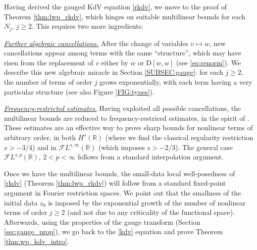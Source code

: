 \documentclass[%
11pt,  reqno]{amsart}
\newcommand{\5}{\textup{V}}
\newcommand{\noi}{\noindent}
\newcommand{\FL}{\mathcal{F} L}
\theoremstyle{remark}
\newcommand{\R}{\mathbb{R}}
\numberwithin{equation}{section}
\numberwithin{theorem}{section}
\newcommand{\D}{\mathrm{D}}
\begin{document}
	
	
	Having derived the gauged KdV equation \eqref{rkdv}, we move to the proof of Theorem \ref{thm:lwp_rkdv}, which hinges on suitable multilinear bounds for each $N_j$, $j\ge 2$. This requires two more ingredients:

    \smallskip
    \noi\textit{\underline{Further algebraic cancellations.}} After the change of variables $v\mapsto w$, new cancellations appear among terms with the same ``structure'', which may have risen from the replacement of $v$ either by $w$ or $\D[w,w]$ (see \eqref{eq:renorm}). We describe this new algebraic miracle in Section \ref{SUBSEC:gauge}:  for each $j\ge 2$, the number of terms of order $j$ grows exponentially, with each term having a very particular structure (see also Figure \ref{FIG:types}).
    
    \smallskip
    \noi\textit{\underline{Frequency-restricted estimates.}} Having exploited all possible cancellations, the multilinear bounds are reduced to frequency-restriced estimates, in the spirit of \cite{CC24, CLS, COS}. These estimates are an effective way to prove sharp bounds for nonlinear terms of arbitrary order, in both $H^s(\R)$ (where we find the classical regularity restriction $s>-3/4$) and in $\FL^{s,\infty}(\R)$ (which imposes $s>-2/3$). The general case $\FL^{s,p}(\R)$, $2<p<\infty$ follows from a standard interpolation argument.
	
	\medskip
	
	
	Once we have the multilinear bounds, the small-data local well-posedness of \eqref{rkdv} (Theorem \ref{thm:lwp_rkdv}) will follow from a standard fixed-point argument in Fourier restriction spaces. We point out that the smallness of the initial data $z_0$ is imposed by the exponential growth of the number of nonlinear terms of order $j\ge 2$ (and not due to any criticality of the functional space). Afterwards, using the properties of the gauge transform (Section \ref{sec:gauge_prop}), we go back to the \eqref{kdv} equation and prove Theorem \ref{thm:wp_kdv_intro}.

    
\end{document}
